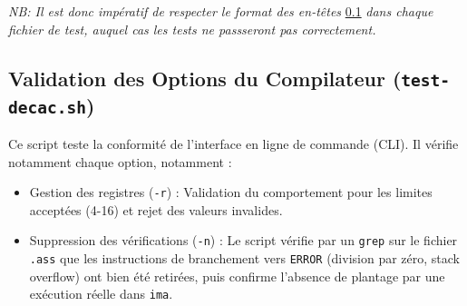 \noindent
\textit{NB: Il est donc impératif de respecter le format des en-têtes} \ref{} \textit{dans chaque fichier de test, auquel cas les tests ne passseront pas correctement.}

\subsection{Validation des Options du Compilateur (\texttt{test-decac.sh})} 
\noindent Ce script teste la conformité de l'interface en ligne de commande (CLI). Il vérifie notamment chaque option, notamment : 
\begin{itemize} [label=$\circ$]
    \item Gestion des registres (\texttt{-r}) : Validation du comportement pour les limites acceptées (4-16) et rejet des valeurs invalides. 
    \item Suppression des vérifications (\texttt{-n}) : Le script vérifie par un \texttt{grep} sur le fichier \texttt{.ass} que les instructions de branchement vers \texttt{ERROR} (division par zéro, stack overflow) ont bien été retirées, puis confirme l'absence de plantage par une exécution réelle dans \texttt{ima}. 
\end{itemize}

